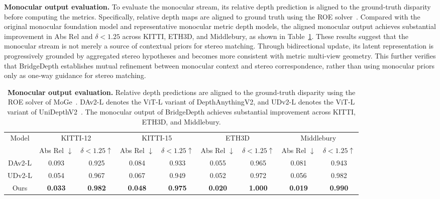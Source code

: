 \noindent\textbf{Monocular output evaluation.} To evaluate the monocular stream, its relative depth prediction is aligned to the ground-truth disparity before computing the metrics.
Specifically, relative depth maps are aligned to ground truth using the ROE solver~\cite{wang2025moge}.
Compared with the original monocular foundation model and representative monocular metric depth models, the aligned monocular output achieves substantial improvement in Abs Rel and $\delta < 1.25$ across KITTI, ETH3D, and Middlebury, as shown in Table~\ref{supp:tab_depth}.
These results suggest that the monocular stream is not merely  a source of contextual priors for stereo matching.
Through bidirectional update, its latent representation is progressively grounded by aggregated stereo hypotheses and becomes more consistent with metric multi-view geometry.
This further verifies that BridgeDepth establishes mutual refinement between monocular context and stereo correspondence, rather than using monocular priors only as one-way guidance for stereo matching.

\begin{table}[t]
	\footnotesize
	\centering
	\begin{tabular}{c|cc|cc|cc|cc}
		\toprule
		\multirow{2}{*}{Model}& \multicolumn{2}{c|}{KITTI-12} & \multicolumn{2}{c|}{KITTI-15} & \multicolumn{2}{c|}{ETH3D} & \multicolumn{2}{c}{Middlebury}\\
		& Abs Rel $\downarrow$ & $\delta<1.25 \uparrow$ & Abs Rel $\downarrow$ & $\delta<1.25 \uparrow$ & Abs Rel $\downarrow$ & $\delta<1.25 \uparrow$ & Abs Rel $\downarrow$ & $\delta<1.25 \uparrow$ \\
		\midrule
		DAv2-L & 0.093 & 0.925 & 0.084 & 0.933 & 0.055 & 0.965 & 0.081 & 0.943\\
		UDv2-L & 0.054 & 0.967 & 0.067 & 0.949 & 0.052 & 0.972 & 0.056 & 0.982\\
		Ours & \textbf{0.033} & \textbf{0.982} & \textbf{0.048} & \textbf{0.975} & \textbf{0.020} & \textbf{1.000} & \textbf{0.019} & \textbf{0.990}\\
		\bottomrule
	\end{tabular}
	\vspace{-1.0em}
	\caption{\textbf{Monocular output evaluation.}
	Relative depth predictions are aligned to the ground-truth disparity using the ROE solver of MoGe~\cite{wang2025moge}.
	DAv2-L denotes the ViT-L variant of DepthAnythingV2, and UDv2-L denotes the ViT-L variant of UniDepthV2~\cite{piccinelli2025unidepthv2}.
	The monocular output of BridgeDepth achieves substantial improvement across KITTI, ETH3D, and Middlebury.
	}
	\label{supp:tab_depth}
	\vspace{-1.2em}
\end{table}

